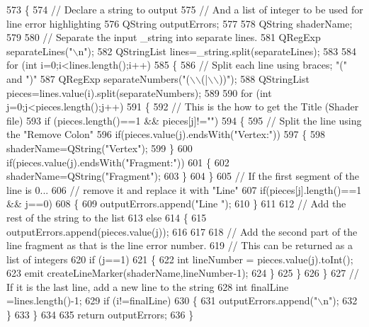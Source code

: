 \begin{DoxyCode}
573 \{
574   \textcolor{comment}{// Declare a string to output}
575   \textcolor{comment}{// And a list of integer to be used for line error highlighting}
576   QString outputErrors;
577 
578   QString shaderName;
579 
580   \textcolor{comment}{// Separate the input \_string into separate lines.}
581   QRegExp separateLines(\textcolor{stringliteral}{"\(\backslash\)n"});
582   QStringList lines=\_string.split(separateLines);
583 
584   \textcolor{keywordflow}{for} (\textcolor{keywordtype}{int} i=0;i<lines.length();i++)
585   \{
586     \textcolor{comment}{// Split each line using braces; "(" and ")"}
587     QRegExp separateNumbers(\textcolor{stringliteral}{"(\(\backslash\)\(\backslash\)(|\(\backslash\)\(\backslash\)))"});
588     QStringList pieces=lines.value(i).split(separateNumbers);
589 
590     \textcolor{keywordflow}{for} (\textcolor{keywordtype}{int} j=0;j<pieces.length();j++)
591     \{
592       \textcolor{comment}{// This is the how to get the Title (Shader file)}
593       \textcolor{keywordflow}{if} (pieces.length()==1 && pieces[j]!=\textcolor{stringliteral}{""})
594       \{
595         \textcolor{comment}{// Split the line using the "Remove Colon"}
596         \textcolor{keywordflow}{if}(pieces.value(j).endsWith(\textcolor{stringliteral}{"Vertex:"}))
597         \{
598           shaderName=QString(\textcolor{stringliteral}{"Vertex"});
599         \}
600         \textcolor{keywordflow}{if}(pieces.value(j).endsWith(\textcolor{stringliteral}{"Fragment:"}))
601         \{
602           shaderName=QString(\textcolor{stringliteral}{"Fragment"});
603         \}
604       \}
605       \textcolor{comment}{// If the first segment of the line is 0...}
606       \textcolor{comment}{// remove it and replace it with "Line"}
607       \textcolor{keywordflow}{if}(pieces[j].length()==1 && j==0)
608       \{
609         outputErrors.append(\textcolor{stringliteral}{"Line "});
610       \}
611 
612       \textcolor{comment}{// Add the rest of the string to the list}
613       \textcolor{keywordflow}{else}
614       \{
615         outputErrors.append(pieces.value(j));
616 
617 
618         \textcolor{comment}{// Add the second part of the line fragment as that is the line error number.}
619         \textcolor{comment}{// This can be returned as a list of integers}
620         \textcolor{keywordflow}{if} (j==1)
621         \{
622           \textcolor{keywordtype}{int} lineNumber = pieces.value(j).toInt();
623           emit createLineMarker(shaderName,lineNumber-1);
624         \}
625       \}
626     \}
627     \textcolor{comment}{// If it is the last line, add a new line to the string}
628     \textcolor{keywordtype}{int} finalLine =lines.length()-1;
629     \textcolor{keywordflow}{if} (i!=finalLine)
630     \{
631       outputErrors.append(\textcolor{stringliteral}{"\(\backslash\)n"});
632     \}
633   \}
634 
635   \textcolor{keywordflow}{return} outputErrors;
636 \}
\end{DoxyCode}


